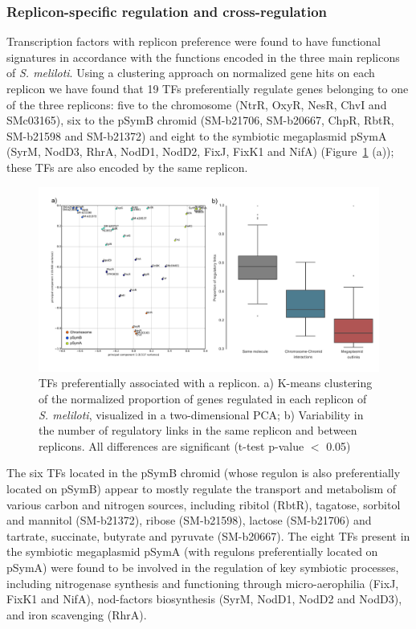 \subsubsection{Replicon-specific regulation and cross-regulation}
Transcription factors with replicon preference were found to have functional signatures in accordance with the functions encoded in the three main replicons of \textit{S. meliloti}.
 Using a clustering approach on normalized gene hits on each replicon we have found that 19 TFs preferentially regulate genes belonging to one of the three replicons: five to the chromosome (NtrR, OxyR, NesR, ChvI and SMc03165), six to the pSymB chromid (SM-b21706, SM-b20667, ChpR, RbtR, SM-b21598 and SM-b21372) and eight to the symbiotic megaplasmid pSymA (SyrM, NodD3, RhrA, NodD1, NodD2, FixJ, FixK1 and NifA) (Figure~\ref{fig:reg5} (a)); these TFs are also encoded by the same replicon. %
\begin{figure}[!tb]
	\centering
	\includegraphics[width=1\textwidth]{./figures/Appendix_1/5_reg}
  	\caption{\label{fig:reg5} TFs preferentially associated with a replicon. a) K-means clustering of the normalized proportion of genes regulated in each replicon of \textit{S. meliloti}, visualized in a two-dimensional PCA; b) Variability in the number of regulatory links in the same replicon and between replicons. All differences are significant (t-test p-value $<$ 0.05)}
\end{figure}%
The six TFs located in the pSymB chromid (whose regulon is also preferentially located on pSymB) appear to mostly regulate the transport and metabolism of various carbon and nitrogen sources, including ribitol (RbtR), tagatose, sorbitol and mannitol (SM-b21372), ribose (SM-b21598), lactose (SM-b21706) and tartrate, succinate, butyrate and pyruvate (SM-b20667).
 The eight TFs present in the symbiotic megaplasmid pSymA (with regulons preferentially located on pSymA) were found to be involved in the regulation of key symbiotic processes, including nitrogenase synthesis and functioning through micro-aerophilia (FixJ, FixK1 and NifA), nod-factors biosynthesis (SyrM, NodD1, NodD2 and NodD3), and iron scavenging (RhrA).

